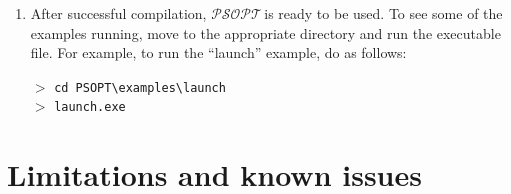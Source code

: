\documentclass[a4paper,11pt]{report}    %
\newcommand{\psopt}{$\mathcal{PSOPT}$\,}  %
\newenvironment{shadedframe}{%
  \def\FrameCommand{\fcolorbox{black}{shadecolor}}%
  \MakeFramed {\FrameRestore}}
{\endMakeFramed}
\begin{document}
\begin{enumerate}
\item  After successful compilation, \psopt is ready to be used.  
To see some of the examples running, move to the appropriate directory and run the executable file. For example, to
run the ``launch'' example, do as follows:

\begin{shadedframe}
   $>$  \verb|cd PSOPT\examples\launch|    \\
   $>$  \verb|launch.exe|
\end{shadedframe}

\end{enumerate}


\section{Limitations and known issues}
\end{document}
